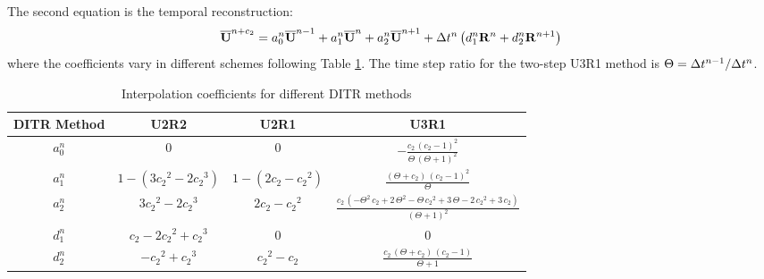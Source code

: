 The second equation is the temporal reconstruction:
\begin{equation}
    \label{eq:TRSum}
    \overline{\mathbf{U}}^{n+c_2}  =
    a^n_0\overline{\mathbf{U}}^{n - 1} +
    a^n_1\overline{\mathbf{U}}^{n} +
    a^n_2\overline{\mathbf{U}}^{n + 1}
    +
    {\Delta} t^n
    \left(
    d^n_1\mathbf{R}^{n} +
    d^n_2\mathbf{R}^{n + 1}
    \right)
\end{equation}
where the coefficients vary in different schemes
following Table \ref{tab:inter0Tab}.
The time step ratio for the two-step U3R1 method is
$\Theta = {\Delta} t^{n-1} / {\Delta} t^{n}$.

\begin{table}[htbp]
    \centering
    \footnotesize
    \begin{tabular}{|c|c|c|c|}
        \hline
        DITR Method & U2R2                          & U2R1                 & U3R1                                                                                                                                   \\
        \hline
        $a^n_0$     & 0                             & 0                    & $-\frac{c_{2}\,{\left(c_{2}-1\right)}^2}{\Theta\,{\left(\Theta+1\right)}^2}$                                                           \\
        \hline
        $a^n_1$     & $1-(3{c_2}^2 - 2 {c_2}^3)$    & $1-(2c_2 - {c_2}^2)$ & $\frac{\left(\Theta+c_{2}\right)\,{\left(c_{2}-1\right)}^2}{\Theta}$                                                                   \\
        \hline
        $a^n_2$     & $3{c_2}^2 - 2 {c_2}^3$        & $2c_2 - {c_2}^2$     & $\frac{c_{2}\,\left(-\Theta^2\,c_{2}+2\,\Theta^2-\Theta\,{c_{2}}^2+3\,\Theta-2\,{c_{2}}^2+3\,c_{2}\right)}{{\left(\Theta+1\right)}^2}$ \\
        \hline
        $d^n_1$     & ${c_2} - 2 {c_2}^2 + {c_2}^3$ & 0                    & 0                                                                                                                                      \\
        \hline
        $d^n_2$     & $- {c_2}^2 + {c_2}^3$         & ${c_2}^2 - {c_2}$    & $\frac{c_{2}\,\left(\Theta+c_{2}\right)\,\left(c_{2}-1\right)}{\Theta+1}$                                                              \\
        \hline
    \end{tabular}
    \caption{Interpolation coefficients for different DITR methods}
    \label{tab:inter0Tab}
\end{table}


